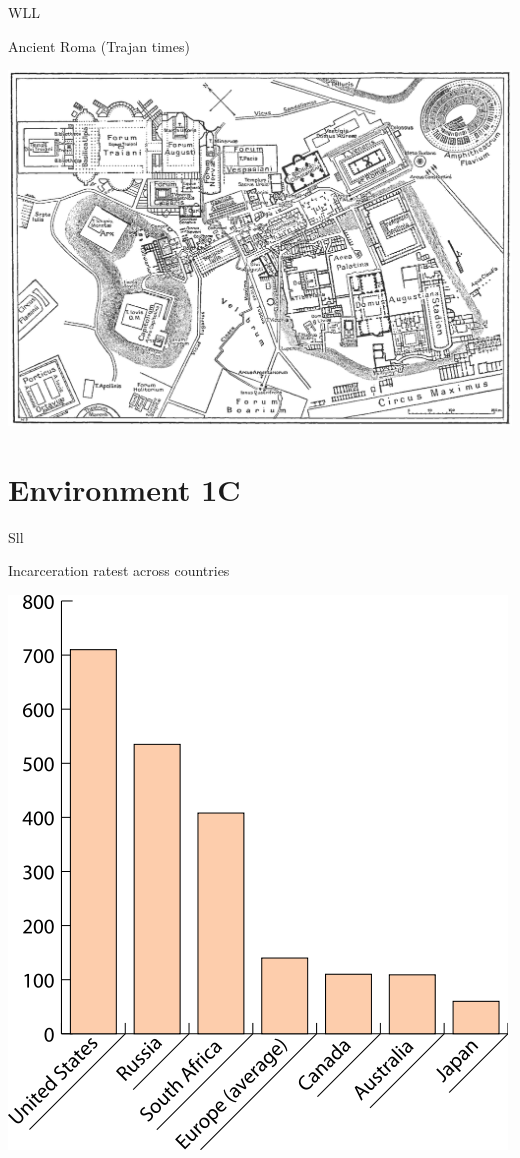 \begin{map}{W}{LL}
\caption{Ancient Roma  (Trajan times)}
\label{map:roma}
\includegraphics[width=\chartwidth,height=\chartheight]{Rome}
\end{map}



\section{Environment 1C}


\begin{chart}{S}{ll}
\caption{Incarceration ratest across countries}
\label{chart:incarceration}
\includegraphics[width=\chartwidth,height=\chartheight]{incarceration}  
\end{chart}

